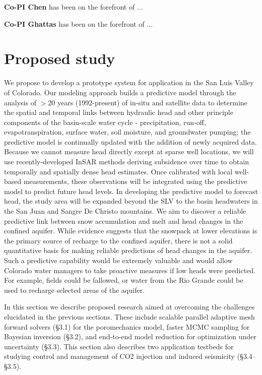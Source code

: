 \documentclass[11pt,final]{article}%
\begin{document}
\textbf{Co-PI Chen} has been on the forefront of ...

\textbf{Co-PI Ghattas} has been on the forefront of ...


\section{Proposed study}
We propose to develop a prototype system for application in the San Luis Valley of Colorado. Our modeling approach builds a predictive model through the analysis of $>$20 years (1992-present) of in-situ and satellite data to determine the spatial and temporal links between hydraulic head and other principle components of the basin-scale water cycle - precipitation, run-off, evapotranspiration, surface water, soil moisture, and groundwater pumping; the predictive model is continually updated with the addition of newly acquired data. Because we cannot measure head directly except at sparse well locations, we will use recently-developed InSAR methods deriving subsidence over time to obtain temporally and spatially dense head estimates.  Once calibrated with local well-based measurements, these observations will be integrated using the predictive model to predict future head levels. In developing the predictive model to forecast head, the study area will be expanded beyond the SLV to the basin headwaters in the San Juan and Sangre De Christo mountains. We aim to discover a reliable predictive link between snow accumulation and melt and head changes in the confined aquifer.  While evidence suggests that the snowpack at lower elevations is the primary source of recharge to the confined aquifer, there is not a solid quantitative basis for making reliable predictions of head changes in the aquifer.  Such a predictive capability would be extremely valuable and would allow Colorado water managers to take proactive measures if low heads were predicted.  For example, fields could be fallowed, or water from the Rio Grande could be used to recharge selected areas of the aquifer.


In this section we describe proposed research aimed at overcoming the challenges elucidated in the previous sections. These include scalable parallel adaptive mesh forward solvers (§3.1) for the poromechanics model, faster MCMC sampling for Bayesian inversion (§3.2), and end-to-end model reduction for optimization under uncertainty (§3.3). This section also describes two application testbeds for studying control and management of CO2 injection and induced seismicity (§3.4–§3.5).
\end{document}
